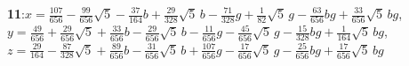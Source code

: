\documentclass[10pt]{article}
\begin{document}
{\noindent\textbf{11}:\quad $x=\tfrac{107}{656}-\tfrac{99}{656}\sqrt5-\tfrac{37}{164}b+\tfrac{29}{328}\sqrt5\,b-\tfrac{71}{328}g+\tfrac{1}{82}\sqrt5\,g-\tfrac{63}{656}bg+\tfrac{33}{656}\sqrt5\,bg$,\quad $y=\tfrac{49}{656}+\tfrac{29}{656}\sqrt5+\tfrac{33}{656}b-\tfrac{29}{656}\sqrt5\,b-\tfrac{11}{656}g-\tfrac{45}{656}\sqrt5\,g-\tfrac{15}{328}bg+\tfrac{1}{164}\sqrt5\,bg$,\quad $z=\tfrac{29}{164}-\tfrac{87}{328}\sqrt5+\tfrac{89}{656}b-\tfrac{31}{656}\sqrt5\,b+\tfrac{107}{656}g-\tfrac{17}{656}\sqrt5\,g-\tfrac{25}{656}bg+\tfrac{17}{656}\sqrt5\,bg$\par\smallskip
}
\end{document}
